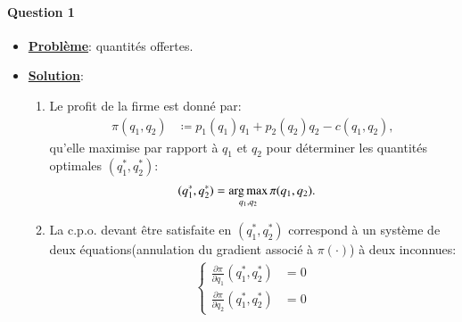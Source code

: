     \begin{frame}
      [allowframebreaks]{\insertsection}
      \framesubtitle{Question 1\\}
      \begin{itemize}
    \item \textbf{\underline{Problème}}:  quantités offertes.
    \item \textbf{\underline{Solution}}: 
    \begin{enumerate}[$\cdot$]
     \item Le profit de la firme est donné par:
     \begin{align}
      \pi(q_1, q_2) &\coloneqq p_1(q_1)q_1 +  p_2(q_2)q_2 - c(q_1, q_2),
      \label{eq9}
     \end{align}
     qu'elle maximise par rapport à $q_1$ et $q_2$ pour déterminer les quantités optimales $(q_1^*, q_2^*)$:
     \begin{align}
      (q_1^*, q_2^*) &=\argmax_{q_1, q_2}\pi(q_1, q_2).  
      \label{eq10}
     \end{align}
     \item La c.p.o. devant être satisfaite en $(q_1^*, q_2^*)$ correspond à un système de deux équations(annulation du gradient
     associé à $\pi(\cdot)$) à deux inconnues:
     \begin{align}
      \left\{
      \begin{array}{ll}
        \frac{\partial \pi}{\partial q_1}(q_1^*, q_2^*) &= 0\\
        \frac{\partial \pi}{\partial q_2}(q_1^*, q_2^*) &= 0
      \end{array}
      \right.
      \label{eq11}
     \end{align}
    \end{enumerate}
  \end{itemize}

    \end{frame}

